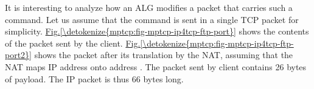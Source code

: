 \documentclass[letterpaper,10pt,english]{sphinxmanual}
\begin{document}
\sphinxAtStartPar
It is interesting to analyze how an ALG modifies a packet that carries such a  command. Let us assume that the  command is sent in a single TCP packet for simplicity. \hyperref[\detokenize{mptcp:fig-mptcp-ip4tcp-ftp-port}]{Fig.\@ \ref{\detokenize{mptcp:fig-mptcp-ip4tcp-ftp-port}}} shows the contents of the packet sent by the client. \hyperref[\detokenize{mptcp:fig-mptcp-ip4tcp-ftp-port2}]{Fig.\@ \ref{\detokenize{mptcp:fig-mptcp-ip4tcp-ftp-port2}}} shows the packet after its translation by the NAT, assuming that the NAT maps IP address  onto address . The packet sent by client contains 26 bytes of payload. The IP packet is thus 66 bytes long.
\begin{figure}[htbp]\centering\capstart{}
\end{figure}
\end{document}
